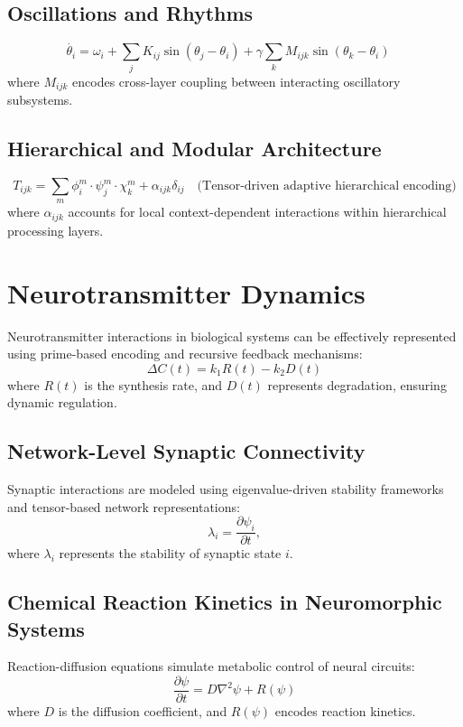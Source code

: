 \documentclass{article}
\theoremstyle{plain}
\begin{document}
\begin{itemize}
\begin{itemize}
\subsection{Oscillations and Rhythms}
\begin{equation}
    \dot{\theta_i} = \omega_i + \sum_{j} K_{ij} \sin(\theta_j - \theta_i) 
    + \gamma \sum_{k} M_{ijk} \sin(\theta_k - \theta_i) 
    \quad 
\end{equation}
where $M_{ijk}$ encodes cross-layer coupling between interacting oscillatory subsystems.

\subsection{Hierarchical and Modular Architecture}
\begin{equation}
    T_{ijk} = \sum_m \phi_{i}^m \cdot \psi_j^m \cdot \chi_k^m + \alpha_{ijk} \delta_{ij} 
    \quad \text{(Tensor-driven adaptive hierarchical encoding)}
\end{equation}
where $\alpha_{ijk}$ accounts for local context-dependent interactions within hierarchical processing layers.
\section{Neurotransmitter Dynamics}
Neurotransmitter interactions in biological systems can be effectively represented using prime-based encoding and recursive feedback mechanisms:
\begin{equation}
    \Delta C(t) = k_1 R(t) - k_2 D(t)
\end{equation}
where $R(t)$ is the synthesis rate, and $D(t)$ represents degradation, ensuring dynamic regulation.

\subsection{Network-Level Synaptic Connectivity}
Synaptic interactions are modeled using eigenvalue-driven stability frameworks and tensor-based network representations:
\begin{equation}
    \lambda_i = \frac{\partial \psi_i}{\partial t},
\end{equation}
where $\lambda_i$ represents the stability of synaptic state $i$.

\subsection{Chemical Reaction Kinetics in Neuromorphic Systems}
Reaction-diffusion equations simulate metabolic control of neural circuits:
\begin{equation}
    \frac{\partial \psi}{\partial t} = D\nabla^2 \psi + R(\psi)
\end{equation}
where $D$ is the diffusion coefficient, and $R(\psi)$ encodes reaction kinetics.


\end{itemize}
\end{itemize}
\end{document}
